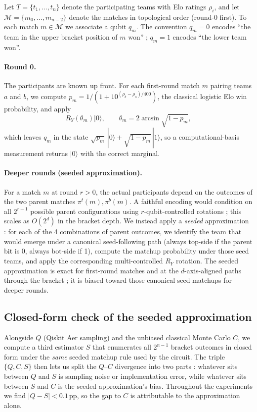 \documentclass[11pt]{article}
\begin{document}
Let $T = \{t_1, \dots, t_n\}$ denote the participating teams with
Elo ratings $\rho_i$, and let $\mathcal{M} = \{m_0, \dots, m_{n-2}\}$
denote the matches in topological order (round-0 first). To each
match $m \in \mathcal{M}$ we associate a qubit $q_m$. The convention
$q_m = 0$ encodes ``the team in the upper bracket position of $m$
won'' ; $q_m = 1$ encodes ``the lower team won''.

\paragraph{Round 0.} The participants are known up front. For each
first-round match $m$ pairing teams $a$ and $b$, we compute
$p_{m} = 1/(1 + 10^{(\rho_b - \rho_a)/400})$, the classical logistic
Elo win probability, and apply
\[
R_Y\!\left(\theta_m\right) |0\rangle, \qquad
\theta_m = 2 \arcsin\!\sqrt{1 - p_m},
\]
which leaves $q_m$ in the state $\sqrt{p_m}\,|0\rangle +
\sqrt{1-p_m}\,|1\rangle$, so a computational-basis measurement
returns $|0\rangle$ with the correct marginal.

\paragraph{Deeper rounds (seeded approximation).} For a match $m$ at
round $r > 0$, the actual participants depend on the outcomes of the
two parent matches $\pi^t(m), \pi^b(m)$. A faithful encoding would
condition on all $2^{r-1}$ possible parent configurations using
$r$-qubit-controlled rotations ; this scales as $O(2^d)$ in the
bracket depth. We instead apply a \emph{seeded} approximation : for
each of the 4 combinations of parent outcomes, we identify the team
that would emerge under a canonical seed-following path (always
top-side if the parent bit is 0, always bot-side if 1), compute the
matchup probability under those seed teams, and apply the
corresponding multi-controlled $R_Y$ rotation. The seeded
approximation is exact for first-round matches and at the
$d$-axis-aligned paths through the bracket ; it is biased toward
those canonical seed matchups for deeper rounds.

\subsection{Closed-form check of the seeded approximation}

Alongside $Q$ (Qiskit Aer sampling) and the unbiased classical
Monte Carlo $C$, we compute a third estimator $S$ that enumerates
all $2^{n-1}$ bracket outcomes in closed form under the \emph{same}
seeded matchup rule used by the circuit. The triple
$\{Q, C, S\}$ then lets us split the $Q$--$C$ divergence into two
parts : whatever sits between $Q$ and $S$ is sampling noise or
implementation error, while whatever sits between $S$ and $C$ is
the seeded approximation's bias. Throughout the experiments we
find $|Q - S| < 0.1$\,pp, so the gap to $C$ is attributable to the
approximation alone.
\end{document}
